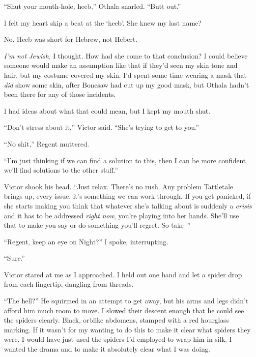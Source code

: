 ``Shut your mouth-hole, heeb,'' Othala snarled.  ``Butt out.''



I felt my heart skip a beat at the `heeb'.  She knew my last name?



No.  Heeb was short for Hebrew, not Hebert.



\emph{I'm not Jewish,} I thought.  How had she come to that conclusion?  I could believe someone would make an assumption like that if they'd seen my skin tone and hair, but my costume covered my skin.  I'd spent some time wearing a mask that \emph{did} show some skin, after Bonesaw had cut up my good mask, but Othala hadn't been there for any of those incidents.



I had ideas about what that could mean, but I kept my mouth shut.



``Don't stress about it,'' Victor said.  ``She's trying to get to you.''



``No shit,'' Regent muttered.



``I'm just thinking if we can find a solution to this, then I can be more confident we'll find solutions to the other stuff.''



Victor shook his head.  ``Just relax.  There's no rush.  Any problem Tattletale brings up, every issue, it's something we can work through.  If you get panicked, if she starts making you think that whatever she's talking about is suddenly a \emph{crisis} and it has to be addressed \emph{right now}, you're playing into her hands.  She'll use that to make you say or do something you'll regret.  So take--''



``Regent, keep an eye on Night?''  I spoke, interrupting.



``Sure.''



Victor stared at me as I approached.  I held out one hand and let a spider drop from each fingertip, dangling from threads.



``The hell?'' He squirmed in an attempt to get away, but his arms and legs didn't afford him much room to move. I slowed their descent enough that he could see the spiders clearly.  Black, orblike abdomens, stamped with a red hourglass marking.  If it wasn't for my wanting to do this to make it clear what spiders they were, I would have just used the spiders I'd employed to wrap him in silk.  I wanted the drama and to make it absolutely clear what I was doing.



